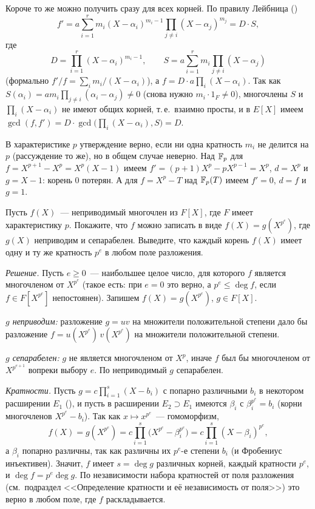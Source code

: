 Короче то же можно получить сразу для всех корней. По правилу Лейбница ()
\[
f'=a\sum_{i=1}^rm_i(X-\alpha_i)^{m_i-1}\prod_{j\ne i}(X-\alpha_j)^{m_j}=D\cdot S,
\]
где
\[
D=\prod_{i=1}^r(X-\alpha_i)^{m_i-1},\qquad S=a\sum_{i=1}^rm_i\prod_{j\ne i}(X-\alpha_j)
\]
(формально $f'/f=\sum_im_i/(X-\alpha_i)$), а $f=D\cdot a\prod_i(X-\alpha_i)$. Так как $S(\alpha_i)=am_i\prod_{j\ne
i}(\alpha_i-\alpha_j)\ne0$ (снова нужно $m_i\cdot1_F\ne0$), многочлены $S$ и $\prod_i(X-\alpha_i)$ не имеют общих корней,
т.\,е.\ взаимно просты, и в $E[X]$ имеем $\gcd(f,f')=D\cdot\gcd\bigl(\prod_i(X-\alpha_i),S\bigr)=D$.

В характеристике $p$ утверждение верно, если ни одна кратность $m_i$ не делится на $p$ (рассуждение то же), но в общем
случае неверно. Над $\mathbb F_p$ для $f=X^{p+1}-X^p=X^p(X-1)$ имеем $f'=(p+1)X^p-pX^{p-1}=X^p$, $d=X^p$ и $g=X-1$: корень $0$
потерян. А для $f=X^p-T$ над $\mathbb F_p(T)$ имеем $f'=0$, $d=f$ и $g=1$.

\begin{exercise}[2-6]
Пусть $f(X)$~--- неприводимый многочлен из $F[X]$, где $F$ имеет характеристику $p$. Покажите, что $f$ можно записать в
виде $f(X)=g(X^{p^e})$, где $g(X)$ неприводим и сепарабелен. Выведите, что каждый корень $f(X)$ имеет одну и ту же
кратность $p^e$ в любом поле разложения.
\end{exercise}

\noindent\emph{Решение.} Пусть $e\ge0$~--- наибольшее целое число, для которого $f$ является многочленом от
$X^{p^e}$ (такое есть: при $e=0$ это верно, а $p^e\le\deg f$, если $f\in F[X^{p^e}]$ непостоянен). Запишем
$f(X)=g(X^{p^e})$, $g\in F[X]$.

\emph{$g$ неприводим:} разложение $g=uv$ на множители положительной степени дало бы разложение
$f=u(X^{p^e})\,v(X^{p^e})$ на множители положительной степени.

\emph{$g$ сепарабелен:} $g$ не является многочленом от $X^p$, иначе $f$ был бы многочленом от $X^{p^{e+1}}$ вопреки
выбору $e$. По  неприводимый $g$ сепарабелен.

\emph{Кратности.} Пусть $g=c\prod_{i=1}^s(X-b_i)$ с попарно различными $b_i$ в некотором расширении $E_1$ (), и
пусть в расширении $E_2\supset E_1$ имеются $\beta_i$ с $\beta_i^{p^e}=b_i$ (корни многочленов $X^{p^e}-b_i$). Так как
$x\mapsto x^{p^e}$~--- гомоморфизм,
\[
f(X)=g(X^{p^e})=c\prod_{i=1}^s\bigl(X^{p^e}-\beta_i^{p^e}\bigr)=c\prod_{i=1}^s(X-\beta_i)^{p^e},
\]
а $\beta_i$ попарно различны, так как различны их $p^e$-е степени $b_i$ (и Фробениус инъективен). Значит, $f$ имеет
$s=\deg g$ различных корней, каждый кратности $p^e$, и $\deg f=p^e\deg g$. По независимости набора кратностей от поля
разложения (см.\ подраздел <<Определение кратности и её независимость от поля>>) это верно в любом поле, где $f$ раскладывается.

